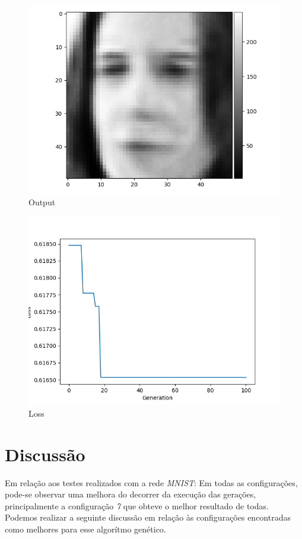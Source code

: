\documentclass[twoside,conference,a4paper]{IEEEtran}
\begin{document}
\begin{figure}[htbp]
        \centering \includegraphics[width=1\columnwidth]{./ia_proj_images/faces_auto_encoder/esther_auto.png}
        \caption{
                \label{fig:esther_auto}
                Output
        }
\end{figure}

\begin{figure}[htbp]
        \centering \includegraphics[width=1\columnwidth]{./ia_proj_images/faces_auto_encoder/loss.png}
        \caption{
                \label{fig:loss_esther}
                Loss
        }
\end{figure}

\section{Discussão}
Em relação aos testes realizados com a rede \emph{MNIST}:
Em todas as configurações, pode-se observar uma melhora do decorrer da execução das gerações, principalmente a configuração \emph{7} que obteve o melhor resultado de todas.
Podemos realizar a seguinte discussão em relação às configurações encontradas como melhores para esse algorítmo genético.
\end{document}
